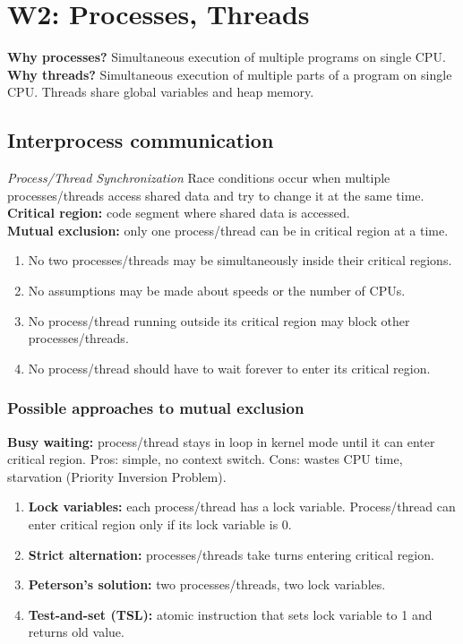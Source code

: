 \section{W2: Processes, Threads}
\textbf{Why processes?} Simultaneous execution of multiple programs on single CPU.\\
\textbf{Why threads?} Simultaneous execution of multiple parts of a program on single CPU. Threads share global variables and heap memory.\\

\subsection{Interprocess communication}
\textit{Process/Thread Synchronization} Race conditions occur when multiple processes/threads access shared data and try to change it at the same time.\\
\textbf{Critical region:} code segment where shared data is accessed.\\
\textbf{Mutual exclusion:} only one process/thread can be in critical region at a time.\\
\begin{enumerate}
    \item No two processes/threads may be simultaneously inside their critical regions.
    \item No assumptions may be made about speeds or the number of CPUs.
    \item No process/thread running outside its critical region may block other processes/threads.
    \item No process/thread should have to wait forever to enter its critical region.
\end{enumerate}

\subsubsection{Possible approaches to mutual exclusion}
\textbf{Busy waiting:} process/thread stays in loop in kernel mode until it can enter critical region. Pros: simple, no context switch. Cons: wastes CPU time, starvation (Priority Inversion Problem).\\
\begin{enumerate}
    \item \textbf{Lock variables:} each process/thread has a lock variable. Process/thread can enter critical region only if its lock variable is 0.\\
    \item \textbf{Strict alternation:} processes/threads take turns entering critical region.\\
    \item \textbf{Peterson's solution:} two processes/threads, two lock variables.\\
    \item \textbf{Test-and-set (TSL):} atomic instruction that sets lock variable to 1 and returns old value.\\
\end{enumerate}

